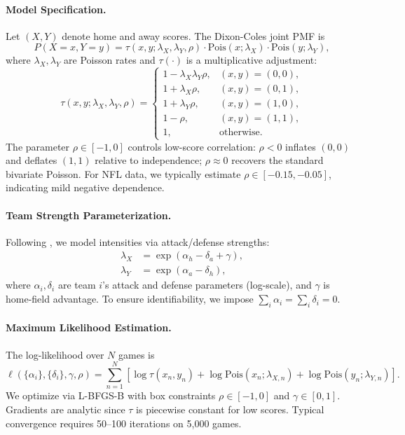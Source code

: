 \paragraph{Model Specification.}
Let $(X,Y)$ denote home and away scores. The Dixon-Coles joint PMF is
\begin{equation}\label{eq:dixon-coles-pmf}
P(X\!=\!x,Y\!=\!y) = \tau(x,y;\lambda_X,\lambda_Y,\rho)\cdot\text{Pois}(x;\lambda_X)\cdot\text{Pois}(y;\lambda_Y),
\end{equation}
where $\lambda_X,\lambda_Y$ are Poisson rates and $\tau(\cdot)$ is a multiplicative adjustment:
\begin{equation}\label{eq:tau-adjustment}
\tau(x,y;\lambda_X,\lambda_Y,\rho)=
\begin{cases}
1-\lambda_X\lambda_Y\rho, & (x,y)=(0,0),\\
1+\lambda_X\rho, & (x,y)=(0,1),\\
1+\lambda_Y\rho, & (x,y)=(1,0),\\
1-\rho, & (x,y)=(1,1),\\
1, & \text{otherwise}.
\end{cases}
\end{equation}
The parameter $\rho\in[-1,0]$ controls low-score correlation: $\rho<0$ inflates $(0,0)$ and deflates $(1,1)$ relative to independence; $\rho\approx 0$ recovers the standard bivariate Poisson. For NFL data, we typically estimate $\rho\in[-0.15,-0.05]$, indicating mild negative dependence.

\paragraph{Team Strength Parameterization.}
Following \citet{maher1982}, we model intensities via attack/defense strengths:
\begin{align}
\lambda_X &= \exp(\alpha_h - \delta_a + \gamma), \label{eq:dc-lambda-home}\\
\lambda_Y &= \exp(\alpha_a - \delta_h), \label{eq:dc-lambda-away}
\end{align}
where $\alpha_i,\delta_i$ are team $i$'s attack and defense parameters (log-scale), and $\gamma$ is home-field advantage. To ensure identifiability, we impose $\sum_i\alpha_i=\sum_i\delta_i=0$.

\paragraph{Maximum Likelihood Estimation.}
The log-likelihood over $N$ games is
\begin{equation}
\ell(\{\alpha_i\},\{\delta_i\},\gamma,\rho) = \sum_{n=1}^N\left[\log\tau(x_n,y_n)+\log\text{Pois}(x_n;\lambda_{X,n})+\log\text{Pois}(y_n;\lambda_{Y,n})\right].
\end{equation}
We optimize via L-BFGS-B with box constraints $\rho\in[-1,0]$ and $\gamma\in[0,1]$. Gradients are analytic since $\tau$ is piecewise constant for low scores. Typical convergence requires 50--100 iterations on 5,000 games.

